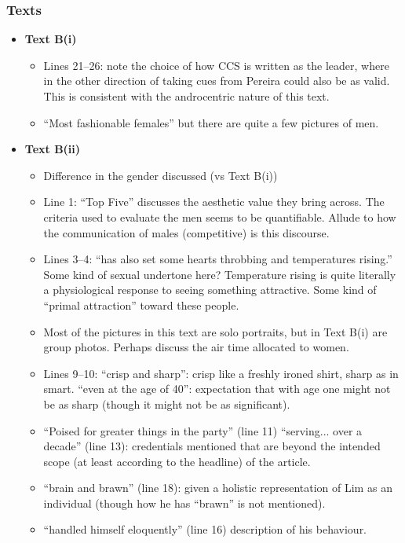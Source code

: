 \documentclass[../main.tex]{subfiles}
\begin{document}
			\subsubsection*{Texts}
				\begin{itemize}
					\item \textbf{Text B(i)} \begin{itemize}
						\item Lines 21--26: note the choice of how CCS is written as the leader, where in the other direction of taking cues from Pereira could also be as valid. This is consistent with the androcentric nature of this text.
						\item ``Most fashionable females'' but there are quite a few pictures of men.
					\end{itemize}
				\item \textbf{Text B(ii)} \begin{itemize}
						\item Difference in the gender discussed (vs Text B(i))
						\item Line 1: ``Top Five'' discusses the aesthetic value they bring across. The criteria used to evaluate the men seems to be quantifiable. Allude to how the communication of males (competitive) is this discourse.
						\item Lines 3--4: ``has also set some hearts throbbing and temperatures rising.'' Some kind of sexual undertone here? Temperature rising is quite literally a physiological response to seeing something attractive. Some kind of ``primal attraction'' toward these people.
						\item Most of the pictures in this text are solo portraits, but in Text B(i) are group photos. Perhaps discuss the air time allocated to women.
						\item Lines 9--10: ``crisp and sharp'': crisp like a freshly ironed shirt, sharp as in smart. ``even at the age of 40'': expectation that with age one might not be as sharp (though it might not be as significant).
						\item ``Poised for greater things in the party'' (line 11) ``serving... over a decade'' (line 13): credentials mentioned that are beyond the intended scope (at least according to the headline) of the article.
						\item ``brain and brawn'' (line 18): given a holistic representation of Lim as an individual (though how he has ``brawn'' is not mentioned).
						\item ``handled himself eloquently'' (line 16) description of his behaviour. 

\end{itemize}
\end{itemize}
\end{document}

